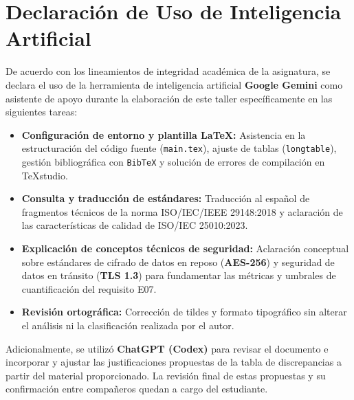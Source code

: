 \documentclass[10pt,a4paper]{article}
\begin{document}
	\section*{Declaración de Uso de Inteligencia Artificial}
	De acuerdo con los lineamientos de integridad académica de la asignatura, se declara el uso de la herramienta de inteligencia artificial \textbf{Google Gemini} como asistente de apoyo durante la elaboración de este taller específicamente en las siguientes tareas:
	\begin{itemize}
		\item \textbf{Configuración de entorno y plantilla \LaTeX:} Asistencia en la estructuración del código fuente (\texttt{main.tex}), ajuste de tablas (\texttt{longtable}), gestión bibliográfica con \texttt{BibTeX} y solución de errores de compilación en TeXstudio.
		\item \textbf{Consulta y traducción de estándares:} Traducción al español de fragmentos técnicos de la norma ISO/IEC/IEEE 29148:2018 y aclaración de las características de calidad de ISO/IEC 25010:2023.
		\item \textbf{Explicación de conceptos técnicos de seguridad:} Aclaración conceptual sobre estándares de cifrado de datos en reposo (\textbf{AES-256}) y seguridad de datos en tránsito (\textbf{TLS 1.3}) para fundamentar las métricas y umbrales de cuantificación del requisito E07.
		\item \textbf{Revisión ortográfica:} Corrección de tildes y formato tipográfico sin alterar el análisis ni la clasificación realizada por el autor.
	\end{itemize}
	Adicionalmente, se utilizó \textbf{ChatGPT (Codex)} para revisar el documento e incorporar y ajustar las justificaciones propuestas de la tabla de discrepancias a partir del material proporcionado. La revisión final de estas propuestas y su confirmación entre compañeros quedan a cargo del estudiante.
	
	
	
	
\end{document}

